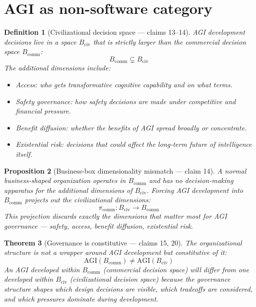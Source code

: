 \documentclass[11pt,a4paper]{article}
\newtheorem{definition}{Definition}[section]
\newtheorem{theorem}[definition]{Theorem}
\newtheorem{proposition}[definition]{Proposition}
\begin{document}
\section{AGI as non-software category}
\label{sec:non-software}

\begin{definition}[Civilizational decision space --- claims 13--14]
\label{def:civ-space}
AGI development decisions live in a space $B_{\text{civ}}$ that is strictly
larger than the commercial decision space $B_{\text{comm}}$:
\[
  B_{\text{comm}} \subsetneq B_{\text{civ}}
\]
The additional dimensions include:
\begin{itemize}
\item Access: who gets transformative cognitive capability and on what terms.
\item Safety governance: how safety decisions are made under competitive
  and financial pressure.
\item Benefit diffusion: whether the benefits of AGI spread broadly or
  concentrate.
\item Existential risk: decisions that could affect the long-term future
  of intelligence itself.
\end{itemize}
\end{definition}

\begin{proposition}[Business-box dimensionality mismatch --- claim 14]
\label{prop:mismatch}
A normal business-shaped organization operates in $B_{\text{comm}}$ and
has no decision-making apparatus for the additional dimensions of
$B_{\text{civ}}$. Forcing AGI development into $B_{\text{comm}}$ projects
out the civilizational dimensions:
\[
  \pi_{\text{comm}} : B_{\text{civ}} \to B_{\text{comm}}
\]
This projection discards exactly the dimensions that matter most for
AGI governance --- safety, access, benefit diffusion, existential risk.
\end{proposition}

\begin{theorem}[Governance is constitutive --- claims 15, 20]
\label{thm:constitutive}
The organizational structure is not a wrapper around AGI development
but constitutive of it:
\[
  \text{AGI}(B_{\text{comm}}) \neq \text{AGI}(B_{\text{civ}})
\]
An AGI developed within $B_{\text{comm}}$ (commercial decision space)
will differ from one developed within $B_{\text{civ}}$ (civilizational
decision space) because the governance structure shapes which design
decisions are visible, which tradeoffs are considered, and which
pressures dominate during development.
\end{theorem}
\end{document}
